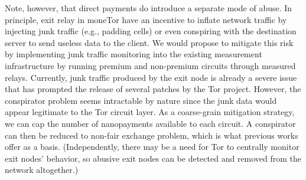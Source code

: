 Note, however, that direct payments do introduce a separate mode of abuse.
In principle, exit relay in moneTor have an incentive to inflate network traffic by injecting junk traffic (e.g., padding cells) or even conspiring with the destination server to send useless data to the client.
We would propose to mitigate this risk by implementing junk traffic monitoring into the existing measurement infrastructure by running premium and non-premium circuits through measured relays.
Currently, junk traffic produced by the exit node is already a severe issue~\cite{rochet2018dropping} that has prompted the release of several patches by the Tor project.
However, the conspirator problem seems intractable by nature since the junk data would appear legitimate to the Tor circuit layer.
As a coarse-grain mitigation strategy, we can cap the number of nanopayments available to each circuit.
A conspirator can then be reduced to non-fair exchange problem, which is what previous works offer as a basis.
(Independently, there may be a need for Tor to centrally monitor exit nodes' behavior, so abusive exit nodes can be detected and removed from the network altogether.)

